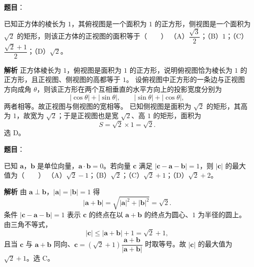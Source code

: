 \begin{answer}

\textbf{题目}：

已知正方体的棱长为 $1$，其俯视图是一个面积为 $1$ 的正方形，侧视图是一个面积为 $\sqrt2$ 的矩形，则该正方体的正视图的面积等于\mbox{（　　）}
（A）$\dfrac{\sqrt3}2$；（B）$1$；（C）$\dfrac{\sqrt2+1}2$；（D）$\sqrt2$。

\textbf{解析}
正方体棱长为 $1$，俯视图是面积为 $1$ 的正方形，说明俯视图恰为棱长为 $1$ 的正方形，且正视图、侧视图的高都等于 $1$。
设俯视图中正方形的一条边与正视图方向成角 $\theta$，则该正方形在两个互相垂直的水平方向上的投影宽度分别为
\nopagebreak[4]
\[|\cos\theta|+|\sin\theta|,\qquad|\sin\theta|+|\cos\theta|,\]
两者相等。故正视图与侧视图的宽相等。
已知侧视图是面积为 $\sqrt2$ 的矩形，其高为 $1$，故宽为 $\sqrt2$；于是正视图也是宽 $\sqrt2$、高 $1$ 的矩形，面积为
\nopagebreak[4]
\[S=\sqrt2\times1=\sqrt2.\]
选 D。


\end{answer}
\begin{answer}

\textbf{题目}：

已知 $\boldsymbol a$，$\boldsymbol b$ 是单位向量，$\boldsymbol a\cdot\boldsymbol b=0$。若向量 $\boldsymbol c$ 满足 $|\boldsymbol c-\boldsymbol a-\boldsymbol b|=1$，则 $|\boldsymbol c|$ 的最大值为\mbox{（　　）}
（A）$\sqrt2-1$；（B）$\sqrt2$；（C）$\sqrt2+1$；（D）$\sqrt2+2$。

\textbf{解析}
由 $\boldsymbol a\perp\boldsymbol b$，$|\boldsymbol a|=|\boldsymbol b|=1$ 得
\nopagebreak[4]
\[|\boldsymbol a+\boldsymbol b|=\sqrt{|\boldsymbol a|^2+|\boldsymbol b|^2}=\sqrt2.\]
条件 $|\boldsymbol c-\boldsymbol a-\boldsymbol b|=1$ 表示 $\boldsymbol c$ 的终点在以 $\boldsymbol a+\boldsymbol b$ 的终点为圆心、$1$ 为半径的圆上。由三角不等式，
\nopagebreak[4]
\[|\boldsymbol c|\leqslant|\boldsymbol a+\boldsymbol b|+1=\sqrt2+1,\]
且当 $\boldsymbol c$ 与 $\boldsymbol a+\boldsymbol b$ 同向、$\boldsymbol c=(\sqrt2+1)\dfrac{\boldsymbol a+\boldsymbol b}{|\boldsymbol a+\boldsymbol b|}$ 时取等号。故 $|\boldsymbol c|$ 的最大值为 $\sqrt2+1$。选 C。


\end{answer}
